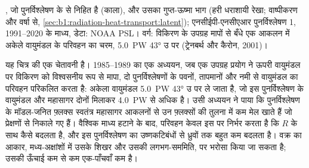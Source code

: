 \begin{omfigure}

{\small {}, जो पुनर्विश्लेषण के  से निहित है (काला), और उसका गुप्त-ऊष्मा भाग (हरी धराशायी रेखा; वाष्पीकरण और वर्षा से, \cref{sec:b1:radiation-heat-transport:latent}); एनसीईपी-एनसीएआर पुनर्विश्लेषण 1, 1991--2020 के माध्य, डेटा: NOAA PSL। वर्ग: विकिरण के उपग्रह मापों से बँधे एक आकलन में अकेले वायुमंडल के परिवहन का चरम, \qty{5.0}{PW} \ang{43} उ पर (ट्रेनबर्थ और कैरोन, 2001)।}
\label{fig:b1:radiation-heat-transport:transport}
\end{omfigure}

यह चित्र की एक चेतावनी है। 1985--1989 का एक अध्ययन, जब एक उपग्रह प्रयोग ने ऊपरी वायुमंडल पर विकिरण को विश्वसनीय रूप से मापा, दो पुनर्विश्लेषणों के पवनों, तापमानों और नमी से वायुमंडल का परिवहन परिकलित करता है: अकेला वायुमंडल \qty{5.0}{PW} \ang{43} उ पर ले जाता है, जो इस पुनर्विश्लेषण के वायुमंडल और महासागर दोनों मिलाकर \qty{4.0}{PW} से अधिक है। उसी अध्ययन ने पाया कि पुनर्विश्लेषण के मॉडल-जनित फ़्लक्स स्वतंत्र महासागर आकलनों से उन फ़्लक्सों की तुलना में कम मेल खाते हैं जो प्रेक्षणों से निकाले गए हैं। वैश्विक माध्य हटाने के बाद, परिवहन केवल इस पर निर्भर करता है कि $R$  के साथ कैसे बदलता है, और इस पुनर्विश्लेषण का  उष्णकटिबंधों से ध्रुवों तक बहुत कम बदलता है। वक्र का आकार, मध्य-अक्षांशों में उसके शिखर और उसकी लगभग-सममिति, पर भरोसा किया जा सकता है; उसकी ऊँचाई कम से कम एक-पाँचवाँ कम है।


